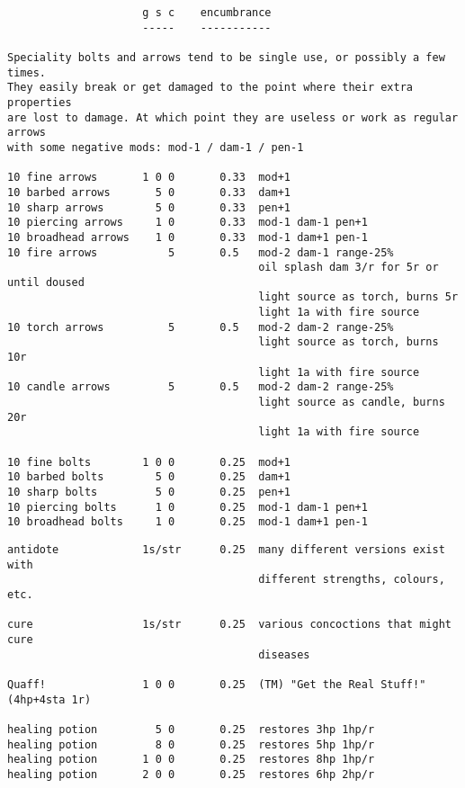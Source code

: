 \small
\begin{verbatim}
                     g s c    encumbrance
                     -----    -----------

Speciality bolts and arrows tend to be single use, or possibly a few times.
They easily break or get damaged to the point where their extra properties
are lost to damage. At which point they are useless or work as regular arrows
with some negative mods: mod-1 / dam-1 / pen-1

10 fine arrows       1 0 0       0.33  mod+1
10 barbed arrows       5 0       0.33  dam+1
10 sharp arrows        5 0       0.33  pen+1
10 piercing arrows     1 0       0.33  mod-1 dam-1 pen+1
10 broadhead arrows    1 0       0.33  mod-1 dam+1 pen-1
10 fire arrows           5       0.5   mod-2 dam-1 range-25%
                                       oil splash dam 3/r for 5r or until doused
                                       light source as torch, burns 5r
                                       light 1a with fire source
10 torch arrows          5       0.5   mod-2 dam-2 range-25%
                                       light source as torch, burns 10r
                                       light 1a with fire source
10 candle arrows         5       0.5   mod-2 dam-2 range-25%
                                       light source as candle, burns 20r
                                       light 1a with fire source

10 fine bolts        1 0 0       0.25  mod+1
10 barbed bolts        5 0       0.25  dam+1
10 sharp bolts         5 0       0.25  pen+1
10 piercing bolts      1 0       0.25  mod-1 dam-1 pen+1
10 broadhead bolts     1 0       0.25  mod-1 dam+1 pen-1

\end{verbatim} \pagebreak[1] \begin{verbatim}
antidote             1s/str      0.25  many different versions exist with
                                       different strengths, colours, etc.

cure                 1s/str      0.25  various concoctions that might cure
                                       diseases

Quaff!               1 0 0       0.25  (TM) "Get the Real Stuff!"  (4hp+4sta 1r)

healing potion         5 0       0.25  restores 3hp 1hp/r
healing potion         8 0       0.25  restores 5hp 1hp/r
healing potion       1 0 0       0.25  restores 8hp 1hp/r
healing potion       2 0 0       0.25  restores 6hp 2hp/r


\end{verbatim}
